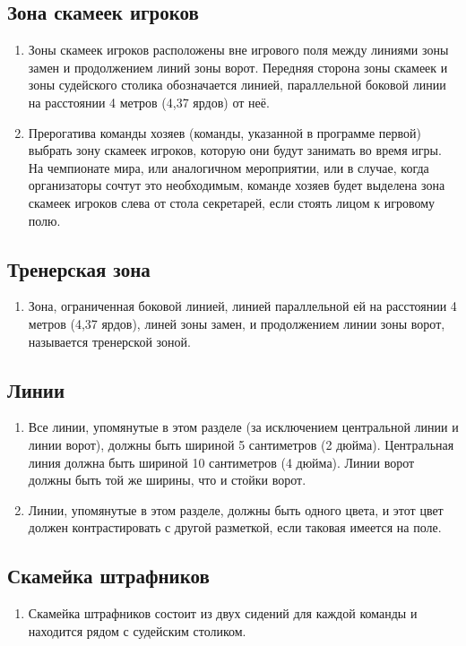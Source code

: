 \documentclass[../main.tex]{subfiles}
\begin{document}
\subsection{Зона скамеек игроков}
\begin{enumerate}
  \item Зоны скамеек игроков расположены вне игрового поля между линиями зоны замен и продолжением линий зоны ворот.\newline
  Передняя сторона зоны скамеек и зоны судейского столика обозначается линией, параллельной боковой линии на расстоянии 4 метров (4,37 ярдов) от неё.
  \item Прерогатива команды хозяев (команды, указанной в программе первой) выбрать зону скамеек игроков, которую они будут занимать во время игры.\newline
  На чемпионате мира, или аналогичном мероприятии, или в случае, когда организаторы сочтут это необходимым, команде хозяев будет выделена зона скамеек игроков слева от стола секретарей, если стоять лицом к игровому полю.
\end{enumerate}

\subsection{Тренерская зона}
\begin{enumerate}
  \item Зона, ограниченная боковой линией, линией параллельной ей на расстоянии 4 метров (4,37 ярдов), линей зоны замен, и продолжением линии зоны ворот, называется тренерской зоной.
\end{enumerate}

\subsection{Линии}
\begin{enumerate}
  \item Все линии, упомянутые в этом разделе (за исключением центральной линии и линии ворот), должны быть шириной 5 сантиметров (2 дюйма).\newline
  Центральная линия должна быть шириной 10 сантиметров (4 дюйма).\newline
  Линии ворот должны быть той же ширины, что и стойки ворот.
  \item Линии, упомянутые в этом разделе, должны быть одного цвета, и этот цвет должен контрастировать с другой разметкой, если таковая имеется на поле.
\end{enumerate}

\subsection{Скамейка штрафников}
\begin{enumerate}
  \item Скамейка штрафников состоит из двух сидений для каждой команды и находится рядом с судейским столиком.
\end{enumerate}
\end{document}
